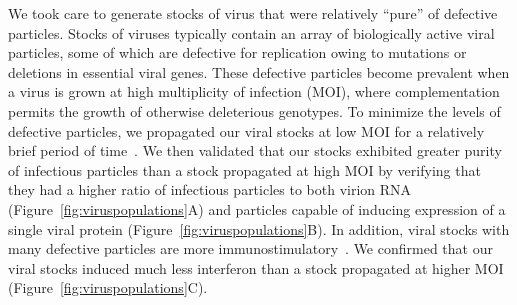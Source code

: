 \documentclass[9pt,lineno]{elife}
\begin{document}
We took care to generate stocks of virus that were relatively ``pure'' of defective particles.
Stocks of viruses typically contain an array of biologically active viral particles, some of which are defective for replication owing to mutations or deletions in essential viral genes.
These defective particles become prevalent when a virus is grown at high multiplicity of infection (MOI), where complementation permits the growth of otherwise deleterious genotypes.
To minimize the levels of defective particles, we propagated our viral stocks at low MOI for a relatively brief period of time~\citep{xue2016propagation}.
We then validated that our stocks exhibited greater purity of infectious particles than a stock propagated at high MOI by verifying that they had a higher ratio of infectious particles to both virion RNA (Figure~\ref{fig:viruspopulations}A) and particles capable of inducing expression of a single viral protein (Figure~\ref{fig:viruspopulations}B).
In addition, viral stocks with many defective particles are more immunostimulatory~\citep{tapia2013defective}.
We confirmed that our viral stocks induced much less interferon than a stock propagated at higher MOI (Figure~\ref{fig:viruspopulations}C).
\end{document}
